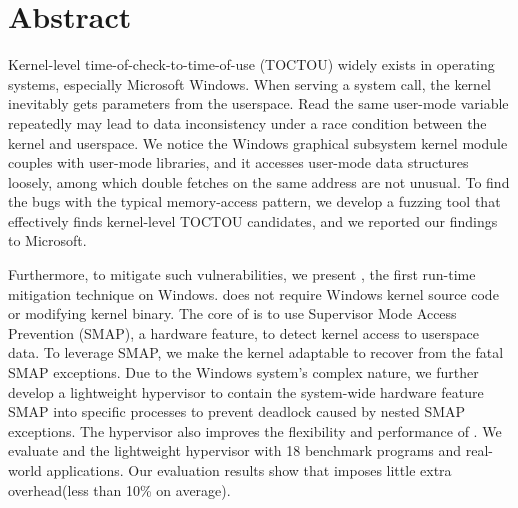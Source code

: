 \section{Abstract}




Kernel-level time-of-check-to-time-of-use (TOCTOU) widely exists in operating systems, especially Microsoft Windows. When serving a system call, the kernel inevitably gets parameters from the userspace. Read the same user-mode variable repeatedly may lead to data inconsistency under a race condition between the kernel and userspace.  We notice the Windows graphical subsystem kernel module couples with user-mode libraries, and it accesses user-mode data structures loosely, among which double fetches on the same address are not unusual. To find the bugs with the typical memory-access pattern, we develop a fuzzing tool that effectively finds kernel-level TOCTOU candidates, and we reported our findings to Microsoft. 

Furthermore, to mitigate such vulnerabilities, we present \name, the first run-time mitigation technique on Windows. \name does not require Windows kernel source code or modifying kernel binary. The core of \name is to use Supervisor Mode Access Prevention (SMAP), a hardware feature, to detect kernel access to userspace data. To leverage SMAP, we make the kernel adaptable to recover from the fatal SMAP exceptions. Due to the Windows system's complex nature, we further develop a lightweight hypervisor to contain the system-wide hardware feature SMAP into specific processes to prevent deadlock caused by nested SMAP exceptions. The hypervisor also improves the flexibility and performance of \name. We evaluate \name and the lightweight hypervisor with 18 benchmark programs and real-world applications. Our evaluation results show that \name imposes little extra overhead(less than 10\% on average).

